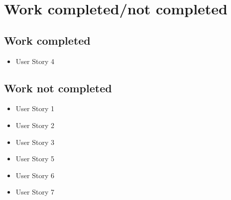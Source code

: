 \documentclass[10pt]{article}
\newcommand{\fancysecX}[2] {{\color{primary}\section*{#1} \label{sec:#2}}}
\newcommand{\fancysubX}[2] {{\color{primary}\subsection*{#1} \label{sec:#2}}}
\begin{document}
     


\fancysecX{Work completed/not completed}{completeWork}

	\fancysubX{Work completed}{completed}
		\begin{itemize}
            \item User Story 4
    	\end{itemize}

    \fancysubX{Work not completed}{notCompleted}
		\begin{itemize}
		    \item User Story 1
		    \item User Story 2
            \item User Story 3
            \item User Story 5
            \item User Story 6
            \item User Story 7
    	\end{itemize}
\end{document}
